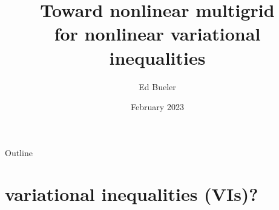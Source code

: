 \documentclass[svgnames,
               hyperref={colorlinks,citecolor=DeepPink4,linkcolor=FireBrick,urlcolor=Maroon},
               usepdftitle=false]  %
               {beamer}
\title[Multigrid for nonlinear VI]{Toward nonlinear multigrid \\ for nonlinear variational inequalities}
\author{Ed Bueler}
\institute[UAF]{University of Alaska Fairbanks}
\date[]{February 2023}
\begin{document}
\beamertemplatenavigationsymbolsempty


{
  \begin{frame}
    \titlepage
  \end{frame}
}

\begin{frame}{Outline}
  \tableofcontents[hideallsubsections]
\end{frame}


\section{variational inequalities (VIs)?}
\end{document}
